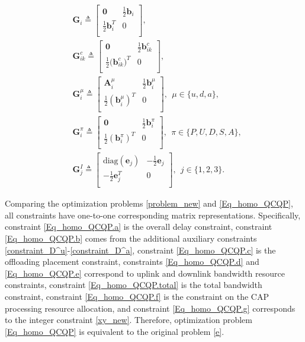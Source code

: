 \documentclass[10pt,journal,compsoc]{IEEEtran}
\begin{document}
\begin{align}
&\mathbf{G}_i\triangleq
\begin{bmatrix}
\mathbf{0}& \frac{1}{2}\mathbf{b}_i\\
\frac{1}{2}\mathbf{b}_i^T&0\\
\end{bmatrix},\nonumber\\
&\mathbf{G}^c_{ik}\triangleq
\begin{bmatrix}
\mathbf{0}& \frac{1}{2}\mathbf{b}^c_{ik}\\
\frac{1}{2}{(\mathbf{b}^c_{ik}})^T&0\\
\end{bmatrix},\nonumber\\
&\mathbf{G}^\mu_i\triangleq
\begin{bmatrix}
\mathbf{A}^\mu_{i}&\frac{1}{2}\mathbf{b}^\mu_{i}\\
\frac{1}{2}{(\mathbf{b}^\mu_{i})}^T&0\\
\end{bmatrix},\ \  \mu\in\{u,d,a\},\nonumber\\
&\mathbf{G}^\pi_{i}\triangleq
\begin{bmatrix}
\mathbf{0}&\frac{1}{2}\mathbf{b}^\pi_{i}\\
\frac{1}{2}{(\mathbf{b}^\pi_{i})}^T&0\\
\end{bmatrix},\ \  \pi\in\{P,U,D,S,A\},\nonumber\\
&\mathbf{G}^I_j\triangleq
\begin{bmatrix}
\textrm{diag}(\mathbf{e}_j)&-\frac{1}{2}\mathbf{e}_j\\
-\frac{1}{2}\mathbf{e}_j^T&0\\
\end{bmatrix},\ \ j \in\{ 1,2,3\}.\nonumber
\end{align}

Comparing the optimization problems \eqref{problem_new} and
\eqref{Eq_homo_QCQP}, all constraints have one-to-one corresponding
matrix representations. Specifically, constraint
\eqref{Eq_homo_QCQP.a} is the overall delay constraint, constraint
\eqref{Eq_homo_QCQP.b} comes from the additional auxiliary
constraints \eqref{constraint_D^u}-\eqref{constraint_D^a},
constraint \eqref{Eq_homo_QCQP.c} is the offloading placement
constraint, constraints \eqref{Eq_homo_QCQP.d} and
\eqref{Eq_homo_QCQP.e} correspond to uplink and downlink bandwidth
resource constraints, constraint \eqref{Eq_homo_QCQP.total} is the
total bandwidth constraint, constraint \eqref{Eq_homo_QCQP.f} is the
constraint on the CAP processing resource allocation, and constraint
\eqref{Eq_homo_QCQP.g} corresponds to the integer constraint
\eqref{xy_new}. Therefore, optimization problem \eqref{Eq_homo_QCQP}
is equivalent to the original problem \eqref{e}.
\end{document}
